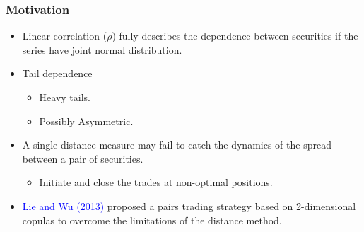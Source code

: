 \documentclass[pdf,9pt,xcolor=dvipsnames,hide notes]{beamer}
\begin{document}
	
	\begin{frame}[label=frame1c]
		\frametitle{Motivation}
		
		
		\begin{itemize}
			\justifying
			
			\item Linear correlation ($\rho$) fully describes the dependence between securities if the series have joint normal distribution. 
			
			
			\pause
			
			\vspace{0.3cm}
			
			\item  Tail dependence
				\begin{itemize}
					\item Heavy tails.
					\item Possibly Asymmetric.
				\end{itemize}
			
			
	\vspace{0.3cm}
	
	\pause
			
		\item A single distance measure may fail to catch the dynamics of the spread between a pair of securities.
		
	\pause
		\begin{itemize}
			\item Initiate and close the trades at non-optimal positions.
		\end{itemize}

	\pause	
			\vspace{0.3cm}
			
			\item \textcolor{blue}{Lie and Wu} \textcolor{blue}{(2013)} proposed a pairs trading strategy based on 2-dimensional copulas to overcome the limitations of the distance method.
			
			\vspace{0.3cm}
			
		
		\end{itemize}
	\end{frame}
\end{document}
